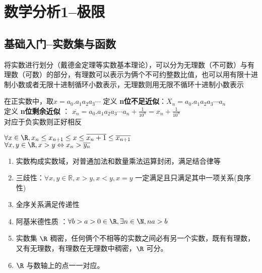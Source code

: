 \chapter{\maoti 数学分析1--极限}
\vspace{1cm}
\section{\zhen 基础入门--实数集与函数}
将实数进行划分（戴德金定理等实数基本理论），可以分为无理数（不可数）与有理数（可数）的部分，有理数可以表示为俩个不可约整数比值，也可以用有限十进制小数或者无限十进制循环小数表示，无理数则用无限不循环十进制小数表示

\begin{definition}[小数的逼近] \label{def:part10001}
	在正实数中，取$x = a_0.a_1 a_2 a_3 \cdots$
	定义 \textbf{n位不足近似}：$X_n = a_0.a_1 a_2 a_3 \cdots a_n $ \\
	定义 \textbf{n位剩余近似 }： $\overline{x_n} = a_0.a_1 a_2 a_3 \cdots a_n + \frac{1}{10^n}=x_n+ \frac{1}{10^n}$ \\
	
	对应于负实数则正好相反 \\
\end{definition}

\begin{conclusion}[大小关系]
 $\forall x \in \R ,  x_{n} \le x_{n+1} \le x \le \overline{x_n+1} \le \overline{x_{n+1}}  $\\
 
 $\forall  x ,y \in \R , x>y \Leftrightarrow x_n > \overline{y_n} $
 
\end{conclusion}


\begin{conclusion}[实数性质]
	\begin{enumerate}
		\item 实数构成实数域，对普通加法和数量乘法运算封闭，满足结合律等
		\item 三歧性：$\forall x ,y \in \mathbb{R} , x >y , x < y , x = y $ 一定满足且只满足其中一项关系(良序性)
		\item 全序关系满足传递性
		\item 阿基米德性质 ：$\forall b >a >0\in  \R , \exists n \in \N , na >b $
		\item 实数集	$\R$ 稠密，任何俩个不相等的实数之间必有另一个实数，既有有理数，又有无理数，有理数在无理数中稠密，$\R$ 可分。
		\item 	$\R$  与数轴上的点一一对应。
	\end{enumerate}

\end{conclusion}



